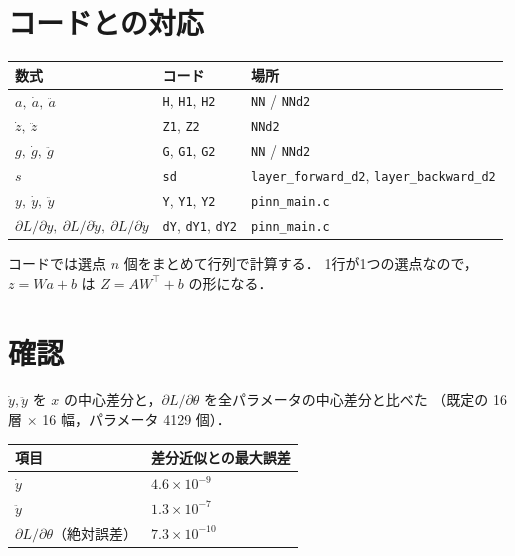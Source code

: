 \documentclass[a4paper,11pt]{ltjsarticle}
\newcommand{\code}[1]{\texttt{#1}}
\begin{document}
\section{コードとの対応}

\begin{center}
\begin{tabular}{lll}
\toprule
数式 & コード & 場所 \\
\midrule
$a,\ \dot a,\ \ddot a$ & \code{H}, \code{H1}, \code{H2} & \code{NN} / \code{NNd2} \\
$\dot z,\ \ddot z$ & \code{Z1}, \code{Z2} & \code{NNd2} \\
$g,\ \dot g,\ \ddot g$ & \code{G}, \code{G1}, \code{G2} & \code{NN} / \code{NNd2} \\
$s$ & \code{sd} & \code{layer\_forward\_d2}, \code{layer\_backward\_d2} \\
$y,\ \dot y,\ \ddot y$ & \code{Y}, \code{Y1}, \code{Y2} & \code{pinn\_main.c} \\
$\partial L/\partial y,\ \partial L/\partial\dot y,\ \partial L/\partial\ddot y$ & \code{dY}, \code{dY1}, \code{dY2} & \code{pinn\_main.c} \\
\bottomrule
\end{tabular}
\end{center}

コードでは選点 $n$ 個をまとめて行列で計算する．
1行が1つの選点なので，$z=Wa+b$ は $Z=AW^{\top}+b$ の形になる．

\section{確認}

$\dot y,\ddot y$ を $x$ の中心差分と，$\partial L/\partial\theta$ を全パラメータの中心差分と比べた
（既定の 16 層 $\times$ 16 幅，パラメータ 4129 個）．
\begin{center}
\begin{tabular}{ll}
\toprule
項目 & 差分近似との最大誤差 \\
\midrule
$\dot y$ & $4.6\times10^{-9}$ \\
$\ddot y$ & $1.3\times10^{-7}$ \\
$\partial L/\partial\theta$（絶対誤差） & $7.3\times10^{-10}$ \\
\bottomrule
\end{tabular}
\end{center}
\end{document}
